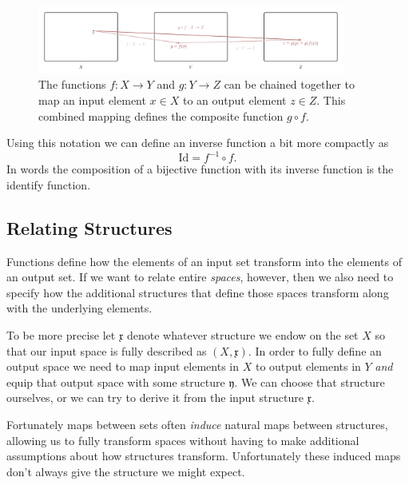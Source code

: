 \documentclass[
  letterpaper,
  DIV=11,
  numbers=noendperiod]{scrartcl}
\begin{document}
\begin{figure}

{\centering \includegraphics[width=0.9\textwidth,height=\textheight]{figures/maps/composition/composition.pdf}

}

\caption{\label{fig-composition}The functions \(f : X \rightarrow Y\)
and \(g : Y \rightarrow Z\) can be chained together to map an input
element \(x \in X\) to an output element \(z \in Z\). This combined
mapping defines the composite function \(g \circ f\).}

\end{figure}

Using this notation we can define an inverse function a bit more
compactly as \[
\text{Id} = f^{-1} \circ f.
\] In words the composition of a bijective function with its inverse
function is the identify function.

\hypertarget{relating-structures}{%
\subsection{Relating Structures}\label{relating-structures}}

Functions define how the elements of an input set transform into the
elements of an output set. If we want to relate entire \emph{spaces},
however, then we also need to specify how the additional structures that
define those spaces transform along with the underlying elements.

To be more precise let \(\mathfrak{x}\) denote whatever structure we
endow on the set \(X\) so that our input space is fully described as
\((X, \mathfrak{x})\). In order to fully define an output space we need
to map input elements in \(X\) to output elements in \(Y\) \emph{and}
equip that output space with some structure \(\mathfrak{y}\). We can
choose that structure ourselves, or we can try to derive it from the
input structure \(\mathfrak{x}\).

Fortunately maps between sets often \emph{induce} natural maps between
structures, allowing us to fully transform spaces without having to make
additional assumptions about how structures transform. Unfortunately
these induced maps don't always give the structure we might expect.
\end{document}
